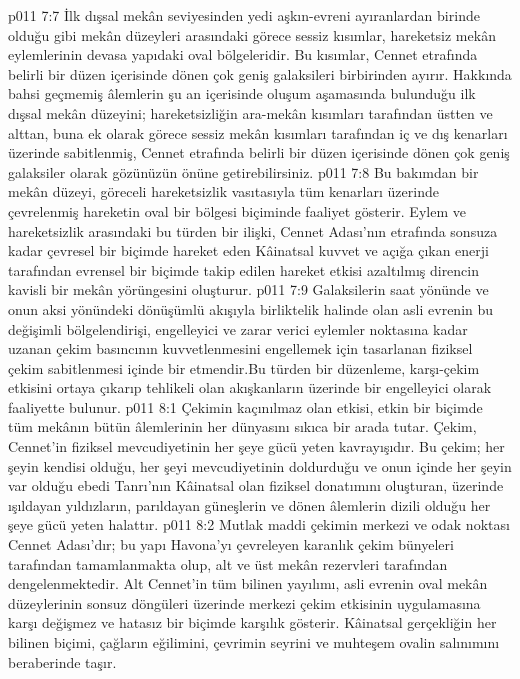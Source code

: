 \vs p011 7:7 İlk dışsal mekân seviyesinden yedi aşkın\hyp{}evreni ayıranlardan birinde olduğu gibi mekân düzeyleri arasındaki görece sessiz kısımlar, hareketsiz mekân eylemlerinin devasa yapıdaki oval bölgeleridir. Bu kısımlar, Cennet etrafında belirli bir düzen içerisinde dönen çok geniş galaksileri birbirinden ayırır. Hakkında bahsi geçmemiş âlemlerin şu an içerisinde oluşum aşamasında bulunduğu ilk dışsal mekân düzeyini; hareketsizliğin ara\hyp{}mekân kısımları tarafından üstten ve alttan, buna ek olarak görece sessiz mekân kısımları tarafından iç ve dış kenarları üzerinde sabitlenmiş, Cennet etrafında belirli bir düzen içerisinde dönen çok geniş galaksiler olarak gözünüzün önüne getirebilirsiniz.
\vs p011 7:8 Bu bakımdan bir mekân düzeyi, göreceli hareketsizlik vasıtasıyla tüm kenarları üzerinde çevrelenmiş hareketin oval bir bölgesi biçiminde faaliyet gösterir. Eylem ve hareketsizlik arasındaki bu türden bir ilişki, Cennet Adası’nın etrafında sonsuza kadar çevresel bir biçimde hareket eden Kâinatsal kuvvet ve açığa çıkan enerji tarafından evrensel bir biçimde takip edilen hareket etkisi azaltılmış direncin kavisli bir mekân yörüngesini oluşturur.
\vs p011 7:9 Galaksilerin saat yönünde ve onun aksi yönündeki dönüşümlü akışıyla birliktelik halinde olan asli evrenin bu değişimli bölgelendirişi, engelleyici ve zarar verici eylemler noktasına kadar uzanan çekim basıncının kuvvetlenmesini engellemek için tasarlanan fiziksel çekim sabitlenmesi içinde bir etmendir.Bu türden bir düzenleme, karşı\hyp{}çekim etkisini ortaya çıkarıp tehlikeli olan akışkanların üzerinde bir engelleyici olarak faaliyette bulunur.
\vs p011 8:1 Çekimin kaçınılmaz olan etkisi, etkin bir biçimde tüm mekânın bütün âlemlerinin her dünyasını sıkıca bir arada tutar. Çekim, Cennet’in fiziksel mevcudiyetinin her şeye gücü yeten kavrayışıdır. Bu çekim; her şeyin kendisi olduğu, her şeyi mevcudiyetinin doldurduğu ve onun içinde her şeyin var olduğu ebedi Tanrı’nın Kâinatsal olan fiziksel donatımını oluşturan, üzerinde ışıldayan yıldızların, parıldayan güneşlerin ve dönen âlemlerin dizili olduğu her şeye gücü yeten halattır.
\vs p011 8:2 Mutlak maddi çekimin merkezi ve odak noktası Cennet Adası’dır; bu yapı Havona’yı çevreleyen karanlık çekim bünyeleri tarafından tamamlanmakta olup, alt ve üst mekân rezervleri tarafından dengelenmektedir. Alt Cennet’in tüm bilinen yayılımı, asli evrenin oval mekân düzeylerinin sonsuz döngüleri üzerinde merkezi çekim etkisinin uygulamasına karşı değişmez ve hatasız bir biçimde karşılık gösterir. Kâinatsal gerçekliğin her bilinen biçimi, çağların eğilimini, çevrimin seyrini ve muhteşem ovalin salınımını beraberinde taşır.
